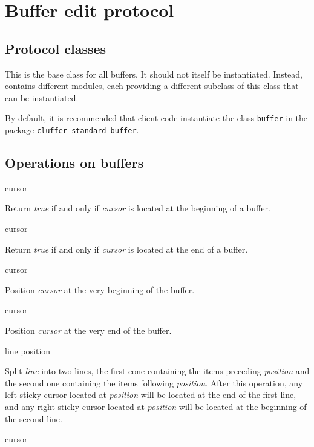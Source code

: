 \section{Buffer edit protocol}
\label{sec-buffer-edit-protocol}

\subsection{Protocol classes}


This is the base class for all buffers.  It should not itself be
instantiated.  Instead, \sysname{} contains different modules, each
providing a different subclass of this class that can be instantiated.

By default, it is recommended that client code instantiate the class
\texttt{buffer} in the package \texttt{cluffer-standard-buffer}.

\subsection{Operations on buffers}

 {cursor}

Return \textit{true} if and only if \textit{cursor} is located at the
beginning of a buffer.

 {cursor}

Return \textit{true} if and only if \textit{cursor} is located at the
end of a buffer.

 {cursor}

Position \textit{cursor} at the very beginning of the buffer.

 {cursor}

Position \textit{cursor} at the very end of the buffer.

 {line position}

Split \textit{line} into two lines, the first cone containing the
items preceding \textit{position} and the second one containing the
items following \textit{position}.  After this operation, any
left-sticky cursor located at \textit{position} will be located at the
end of the first line, and any right-sticky cursor located at
\textit{position} will be located at the beginning of the second line.

 {cursor}

